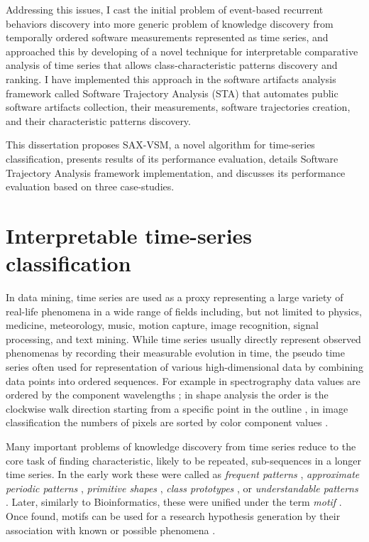 Addressing this issues, I cast the initial problem of event-based recurrent behaviors discovery into more 
generic problem of knowledge discovery from temporally ordered software measurements 
represented as time series, and approached this by developing of a novel technique for interpretable 
comparative analysis of time series that allows class-characteristic patterns discovery and ranking.
I have implemented this approach in the software artifacts analysis framework called 
Software Trajectory Analysis (STA) that automates public software artifacts collection, 
their measurements, software trajectories creation, and their characteristic patterns discovery. 

This dissertation proposes SAX-VSM, a novel algorithm for time-series classification, presents
results of its performance evaluation, details Software Trajectory Analysis framework implementation, 
and discusses its performance evaluation based on three case-studies.

%
%
\section{Interpretable time-series classification}\label{sec_knowledge_discovery}
In data mining, time series are used as a proxy representing a large variety of real-life phenomena 
in a wide range of fields including, but not limited to physics, medicine, meteorology, music, 
motion capture, image recognition, signal processing, and text mining. 
While time series usually directly represent observed phenomenas by recording their measurable evolution 
in time, the pseudo time series often used for representation of various high-dimensional data 
by combining data points into ordered sequences. 
For example in spectrography data values are ordered by the component wavelengths \cite{citeulike:12550833};
in shape analysis the order is the clockwise walk direction starting from a specific point in the outline 
\cite{citeulike:12550835}, in image classification the numbers of pixels are sorted by color component 
values \cite{citeulike:2900542}.

Many important problems of knowledge discovery from time series reduce to the core task of finding 
characteristic, likely to be repeated, sub-sequences in a longer time series. 
In the early work these were called as 
\textit{frequent patterns} \cite{citeulike:5159615}, 
\textit{approximate periodic patterns} \cite{citeulike:1959582},
\textit{primitive shapes} \cite{citeulike:5898869}, 
\textit{class prototypes} \cite{citeulike:4406444}, 
or \textit{understandable patterns} \cite{citeulike:3978076}. 
Later, similarly to Bioinformatics, these were unified under the term \textit{motif} \cite{citeulike:3977965}.
Once found, motifs can be used for a research hypothesis generation by their association with known
or possible phenomena \cite{citeulike:3977965}. 

